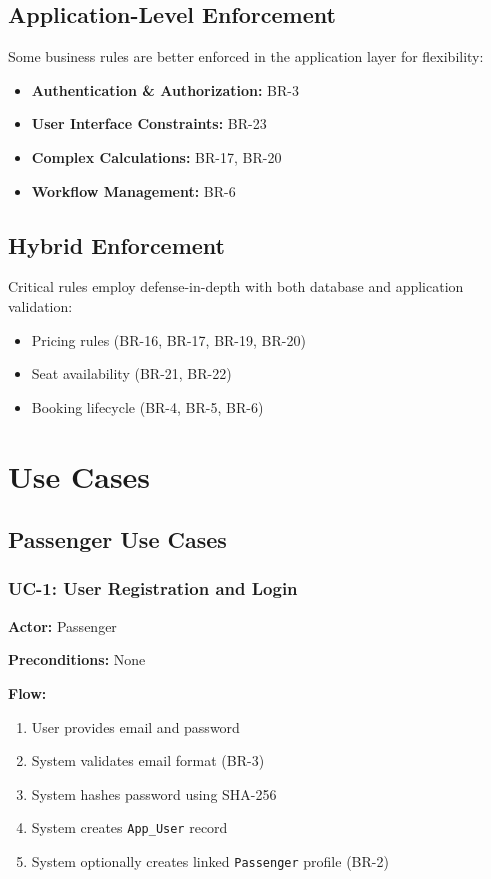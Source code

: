 \documentclass[12pt,a4paper,openany]{report}
\begin{document}
\subsection{Application-Level Enforcement}
Some business rules are better enforced in the application layer for flexibility:
\begin{itemize}
    \item \textbf{Authentication \& Authorization:} BR-3
    \item \textbf{User Interface Constraints:} BR-23
    \item \textbf{Complex Calculations:} BR-17, BR-20
    \item \textbf{Workflow Management:} BR-6
\end{itemize}

\subsection{Hybrid Enforcement}
Critical rules employ defense-in-depth with both database and application validation:
\begin{itemize}
    \item Pricing rules (BR-16, BR-17, BR-19, BR-20)
    \item Seat availability (BR-21, BR-22)
    \item Booking lifecycle (BR-4, BR-5, BR-6)
\end{itemize}

\section{Use Cases}

\subsection{Passenger Use Cases}

\subsubsection{UC-1: User Registration and Login}
\textbf{Actor:} Passenger

\textbf{Preconditions:} None

\textbf{Flow:}
\begin{enumerate}
    \item User provides email and password
    \item System validates email format (BR-3)
    \item System hashes password using SHA-256
    \item System creates \texttt{App\_User} record
    \item System optionally creates linked \texttt{Passenger} profile (BR-2)
\end{enumerate}
\end{document}
